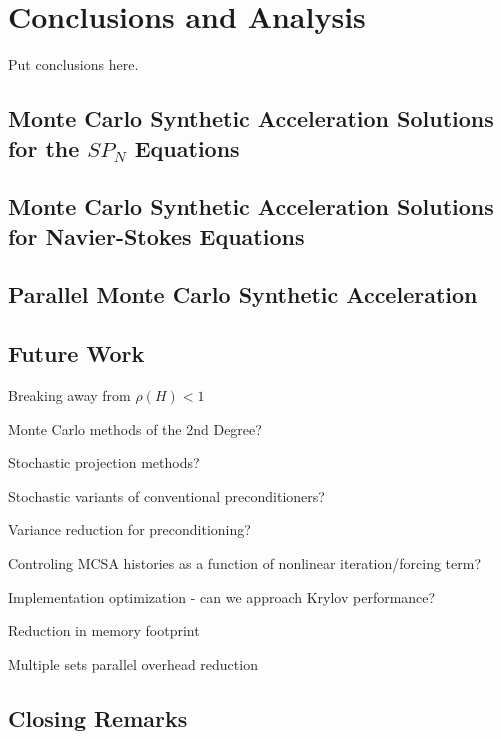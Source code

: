 \chapter{Conclusions and Analysis\ }
\label{ch:conclusion}
Put conclusions here.

\section{Monte Carlo Synthetic Acceleration Solutions for the $SP_N$ Equations\ }
\label{sec:spn_conclusion}

\section{Monte Carlo Synthetic Acceleration Solutions for Navier-Stokes Equations\ }
\label{sec:nonlinear_conclusions}

\section{Parallel Monte Carlo Synthetic Acceleration\ }
\label{sec:parallel_mc_conclusions}

\section{Future Work\ }
\label{sec:future_work}

Breaking away from $\rho(H) < 1$

Monte Carlo methods of the 2nd Degree?

Stochastic projection methods?

Stochastic variants of conventional preconditioners?

Variance reduction for preconditioning?

Controling MCSA histories as a function of nonlinear iteration/forcing
term?

Implementation optimization - can we approach Krylov performance?

Reduction in memory footprint

Multiple sets parallel overhead reduction

\section{Closing Remarks\ }
\label{sec:closing}
